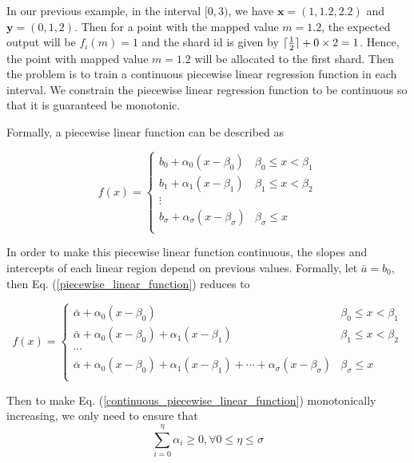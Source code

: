 In our previous example, in the interval $[0,3)$, we have $\boldsymbol{x}=(1,1.2,2.2)$ and $\boldsymbol{y}=(0,1,2)$. Then for a point with the mapped value $m=1.2$, the expected output will be $f_i(m)=1$ and the shard id is given by $\lceil\frac{1}{2}\rceil+0\times 2=1$. Hence, the point with mapped value $m=1.2$ will be allocated to the first shard. Then the problem is to train a continuous piecewise linear regression function in each interval. We constrain the piecewise linear regression function to be continuous so that it is guaranteed be monotonic.

Formally, a piecewise linear function can be described as 

\begin{equation}
\label{piecewise_linear_function}
	f(x)= \begin{cases} 
      b_0+\alpha_0(x-\beta_0) & \beta_0\leq x < \beta_1 \\
      b_1+\alpha_1(x-\beta_1) &  \beta_1\leq x < \beta_2 \\
      \vdots \\
      b_\sigma+\alpha_\sigma(x-\beta_\sigma) &  \beta_\sigma\leq x \\
   \end{cases}
\end{equation}

In order to make this piecewise linear function continuous, the slopes and intercepts of each linear region depend on previous values. Formally, let $\bar{a}=b_0$, then Eq. (\ref{piecewise_linear_function}) reduces to

\begin{equation}
	\label{continuous_piecewise_linear_function}
	f(x)= \begin{cases} 
      \bar{\alpha}+\alpha_0(x-\beta_0) & \beta_0\leq x < \beta_1 \\
      \bar{\alpha}+\alpha_0(x-\beta_0) + \alpha_1(x-\beta_1) &  \beta_1\leq x < \beta_2 \\
      \cdots \\
      \bar{\alpha}+\alpha_0(x-\beta_0) + \alpha_1(x-\beta_1)+\cdots+\alpha_\sigma(x-\beta_\sigma) &  \beta_\sigma\leq x \\
   \end{cases}
\end{equation}


Then to make Eq. (\ref{continuous_piecewise_linear_function}) monotonically increasing, we only need to ensure that $$\sum_{i=0}^\eta \alpha_i\geq 0, \forall 0\leq \eta\leq \sigma$$

